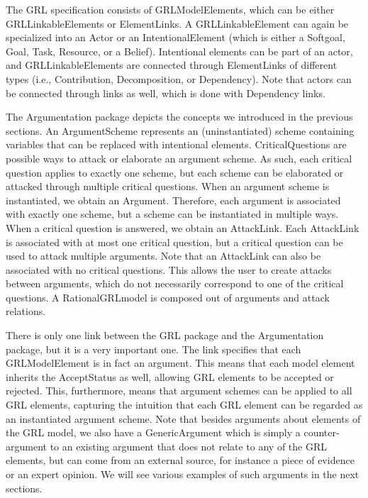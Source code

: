 The GRL specification consists of \textsf{GRLModelElements}, which can be either \textsf{GRLLinkableElements} or \textsf{ElementLinks}. A \textsf{GRLLinkableElement} can again be specialized into an \textsf{Actor} or an \textsf{IntentionalElement} (which is either a \textsf{Softgoal}, \textsf{Goal}, \textsf{Task}, \textsf{Resource}, or a \textsf{Belief}). Intentional elements can be part of an actor, and \textsf{GRLLinkableElements} are connected through \textsf{ElementLinks} of different types (i.e., \textsf{Contribution, Decomposition}, or \textsf{Dependency}). Note that actors can be connected through links as well, which is done with \textsf{Dependency} links. 

The Argumentation package depicts the concepts we introduced in the previous sections. An \textsf{ArgumentScheme} represents an (uninstantiated) scheme containing variables that can be replaced with intentional elements. \textsf{CriticalQuestions} are possible ways to attack or elaborate an argument scheme. As such, each critical question applies to exactly one scheme, but each scheme can be elaborated or attacked through multiple critical questions. When an argument scheme is instantiated, we obtain an \textsf{Argument}. Therefore, each argument is associated with exactly one scheme, but a scheme can be instantiated in multiple ways. When a critical question is answered, we obtain an \textsf{AttackLink}. Each \textsf{AttackLink} is associated with at most one critical question, but a critical question can be used to attack multiple arguments. Note that an \textsf{AttackLink} can also be associated with no critical questions. This allows the user to create attacks between arguments, which do not necessarily correspond to one of the critical questions. A \textsf{RationalGRLmodel} is composed out of arguments and attack relations.

There is only one link between the \textsf{GRL} package and the \textsf{Argumentation} package, but it is a very important one. The link specifies that each \textsf{GRLModelElement} is in fact an argument. This means that each model element inherits the \textsf{AcceptStatus} as well, allowing GRL elements to be accepted or rejected. This, furthermore, means that argument schemes can be applied to all GRL elements, capturing the intuition that each GRL element can be regarded as an instantiated argument scheme. Note that besides arguments about elements of the GRL model, we also have a \textsf{GenericArgument} which is simply a counter-argument to an existing argument that does not relate to any of the GRL elements, but can come from an external source, for instance a piece of evidence or an expert opinion. We will see various examples of such arguments in the next sections.

